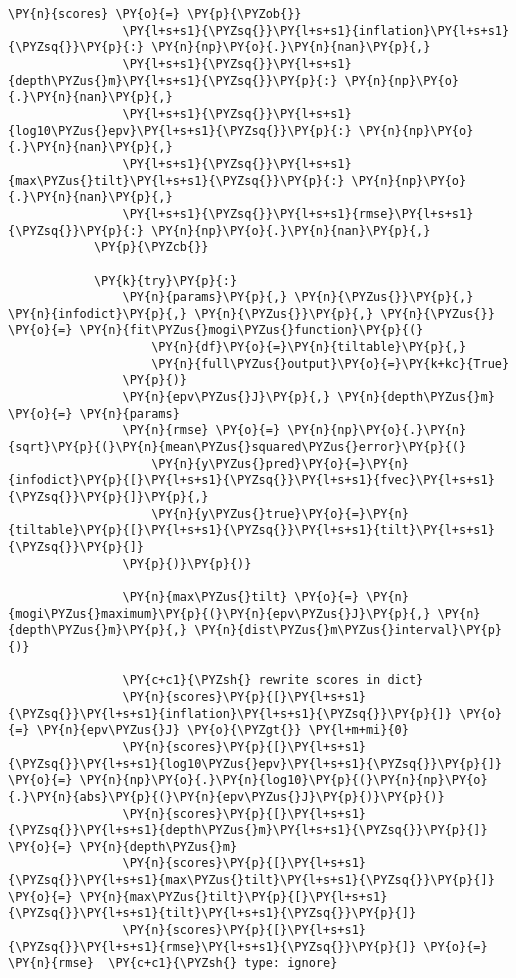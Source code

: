 \begin{tcolorbox}[breakable, size=fbox, boxrule=1pt, pad at break*=1mm,colback=cellbackground, colframe=cellborder]
\begin{Verbatim}[commandchars=\\\{\}]
            \PY{n}{scores} \PY{o}{=} \PY{p}{\PYZob{}}
                \PY{l+s+s1}{\PYZsq{}}\PY{l+s+s1}{inflation}\PY{l+s+s1}{\PYZsq{}}\PY{p}{:} \PY{n}{np}\PY{o}{.}\PY{n}{nan}\PY{p}{,}
                \PY{l+s+s1}{\PYZsq{}}\PY{l+s+s1}{depth\PYZus{}m}\PY{l+s+s1}{\PYZsq{}}\PY{p}{:} \PY{n}{np}\PY{o}{.}\PY{n}{nan}\PY{p}{,}
                \PY{l+s+s1}{\PYZsq{}}\PY{l+s+s1}{log10\PYZus{}epv}\PY{l+s+s1}{\PYZsq{}}\PY{p}{:} \PY{n}{np}\PY{o}{.}\PY{n}{nan}\PY{p}{,}
                \PY{l+s+s1}{\PYZsq{}}\PY{l+s+s1}{max\PYZus{}tilt}\PY{l+s+s1}{\PYZsq{}}\PY{p}{:} \PY{n}{np}\PY{o}{.}\PY{n}{nan}\PY{p}{,}
                \PY{l+s+s1}{\PYZsq{}}\PY{l+s+s1}{rmse}\PY{l+s+s1}{\PYZsq{}}\PY{p}{:} \PY{n}{np}\PY{o}{.}\PY{n}{nan}\PY{p}{,}
            \PY{p}{\PYZcb{}}
    
            \PY{k}{try}\PY{p}{:}
                \PY{n}{params}\PY{p}{,} \PY{n}{\PYZus{}}\PY{p}{,} \PY{n}{infodict}\PY{p}{,} \PY{n}{\PYZus{}}\PY{p}{,} \PY{n}{\PYZus{}} \PY{o}{=} \PY{n}{fit\PYZus{}mogi\PYZus{}function}\PY{p}{(}
                    \PY{n}{df}\PY{o}{=}\PY{n}{tiltable}\PY{p}{,}
                    \PY{n}{full\PYZus{}output}\PY{o}{=}\PY{k+kc}{True}
                \PY{p}{)}
                \PY{n}{epv\PYZus{}J}\PY{p}{,} \PY{n}{depth\PYZus{}m} \PY{o}{=} \PY{n}{params}
                \PY{n}{rmse} \PY{o}{=} \PY{n}{np}\PY{o}{.}\PY{n}{sqrt}\PY{p}{(}\PY{n}{mean\PYZus{}squared\PYZus{}error}\PY{p}{(}
                    \PY{n}{y\PYZus{}pred}\PY{o}{=}\PY{n}{infodict}\PY{p}{[}\PY{l+s+s1}{\PYZsq{}}\PY{l+s+s1}{fvec}\PY{l+s+s1}{\PYZsq{}}\PY{p}{]}\PY{p}{,}
                    \PY{n}{y\PYZus{}true}\PY{o}{=}\PY{n}{tiltable}\PY{p}{[}\PY{l+s+s1}{\PYZsq{}}\PY{l+s+s1}{tilt}\PY{l+s+s1}{\PYZsq{}}\PY{p}{]}
                \PY{p}{)}\PY{p}{)}
    
                \PY{n}{max\PYZus{}tilt} \PY{o}{=} \PY{n}{mogi\PYZus{}maximum}\PY{p}{(}\PY{n}{epv\PYZus{}J}\PY{p}{,} \PY{n}{depth\PYZus{}m}\PY{p}{,} \PY{n}{dist\PYZus{}m\PYZus{}interval}\PY{p}{)}
    
                \PY{c+c1}{\PYZsh{} rewrite scores in dict}
                \PY{n}{scores}\PY{p}{[}\PY{l+s+s1}{\PYZsq{}}\PY{l+s+s1}{inflation}\PY{l+s+s1}{\PYZsq{}}\PY{p}{]} \PY{o}{=} \PY{n}{epv\PYZus{}J} \PY{o}{\PYZgt{}} \PY{l+m+mi}{0}
                \PY{n}{scores}\PY{p}{[}\PY{l+s+s1}{\PYZsq{}}\PY{l+s+s1}{log10\PYZus{}epv}\PY{l+s+s1}{\PYZsq{}}\PY{p}{]} \PY{o}{=} \PY{n}{np}\PY{o}{.}\PY{n}{log10}\PY{p}{(}\PY{n}{np}\PY{o}{.}\PY{n}{abs}\PY{p}{(}\PY{n}{epv\PYZus{}J}\PY{p}{)}\PY{p}{)}
                \PY{n}{scores}\PY{p}{[}\PY{l+s+s1}{\PYZsq{}}\PY{l+s+s1}{depth\PYZus{}m}\PY{l+s+s1}{\PYZsq{}}\PY{p}{]} \PY{o}{=} \PY{n}{depth\PYZus{}m}
                \PY{n}{scores}\PY{p}{[}\PY{l+s+s1}{\PYZsq{}}\PY{l+s+s1}{max\PYZus{}tilt}\PY{l+s+s1}{\PYZsq{}}\PY{p}{]} \PY{o}{=} \PY{n}{max\PYZus{}tilt}\PY{p}{[}\PY{l+s+s1}{\PYZsq{}}\PY{l+s+s1}{tilt}\PY{l+s+s1}{\PYZsq{}}\PY{p}{]}
                \PY{n}{scores}\PY{p}{[}\PY{l+s+s1}{\PYZsq{}}\PY{l+s+s1}{rmse}\PY{l+s+s1}{\PYZsq{}}\PY{p}{]} \PY{o}{=} \PY{n}{rmse}  \PY{c+c1}{\PYZsh{} type: ignore}
    

\end{Verbatim}
\end{tcolorbox}

